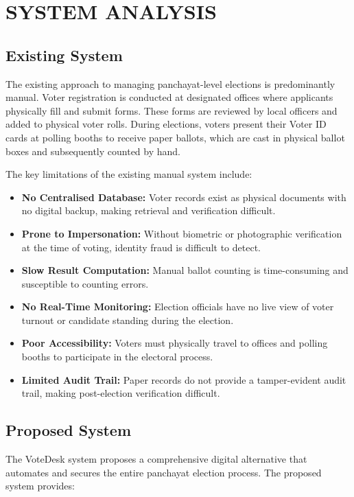 \chapter{SYSTEM ANALYSIS}

\section{Existing System}

The existing approach to managing panchayat-level elections is predominantly manual. Voter registration is conducted at designated offices where applicants physically fill and submit forms. These forms are reviewed by local officers and added to physical voter rolls. During elections, voters present their Voter ID cards at polling booths to receive paper ballots, which are cast in physical ballot boxes and subsequently counted by hand.

The key limitations of the existing manual system include:

\begin{itemize}
    \item \textbf{No Centralised Database:} Voter records exist as physical documents with no digital backup, making retrieval and verification difficult.
    \item \textbf{Prone to Impersonation:} Without biometric or photographic verification at the time of voting, identity fraud is difficult to detect.
    \item \textbf{Slow Result Computation:} Manual ballot counting is time-consuming and susceptible to counting errors.
    \item \textbf{No Real-Time Monitoring:} Election officials have no live view of voter turnout or candidate standing during the election.
    \item \textbf{Poor Accessibility:} Voters must physically travel to offices and polling booths to participate in the electoral process.
    \item \textbf{Limited Audit Trail:} Paper records do not provide a tamper-evident audit trail, making post-election verification difficult.
\end{itemize}

\section{Proposed System}

The VoteDesk system proposes a comprehensive digital alternative that automates and secures the entire panchayat election process. The proposed system provides:

